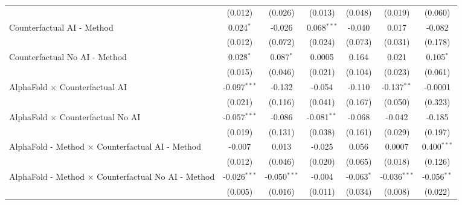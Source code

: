 \begin{tabular}{lcccccc}
                                                              & (0.012)        & (0.026)        & (0.013)       & (0.048)      & (0.019)        & (0.060)\\   
   Counterfactual AI - Method                                 & 0.024$^{*}$    & -0.026         & 0.068$^{***}$ & -0.040       & 0.017          & -0.082\\   
                                                              & (0.012)        & (0.072)        & (0.024)       & (0.073)      & (0.031)        & (0.178)\\   
   Counterfactual No AI - Method                              & 0.028$^{*}$    & 0.087$^{*}$    & 0.0005        & 0.164        & 0.021          & 0.105$^{*}$\\   
                                                              & (0.015)        & (0.046)        & (0.021)       & (0.104)      & (0.023)        & (0.061)\\   
   AlphaFold $\times$ Counterfactual AI                       & -0.097$^{***}$ & -0.132         & -0.054        & -0.110       & -0.137$^{**}$  & -0.0001\\   
                                                              & (0.021)        & (0.116)        & (0.041)       & (0.167)      & (0.050)        & (0.323)\\   
   AlphaFold $\times$ Counterfactual No AI                    & -0.057$^{***}$ & -0.086         & -0.081$^{**}$ & -0.068       & -0.042         & -0.185\\   
                                                              & (0.019)        & (0.131)        & (0.038)       & (0.161)      & (0.029)        & (0.197)\\   
   AlphaFold - Method $\times$ Counterfactual AI - Method     & -0.007         & 0.013          & -0.025        & 0.056        & 0.0007         & 0.400$^{***}$\\   
                                                              & (0.012)        & (0.046)        & (0.020)       & (0.065)      & (0.018)        & (0.126)\\   
   AlphaFold - Method $\times$ Counterfactual No AI - Method  & -0.026$^{***}$ & -0.050$^{***}$ & -0.004        & -0.063$^{*}$ & -0.036$^{***}$ & -0.056$^{**}$\\   
                                                              & (0.005)        & (0.016)        & (0.011)       & (0.034)      & (0.008)        & (0.022)\\   

\end{tabular}
